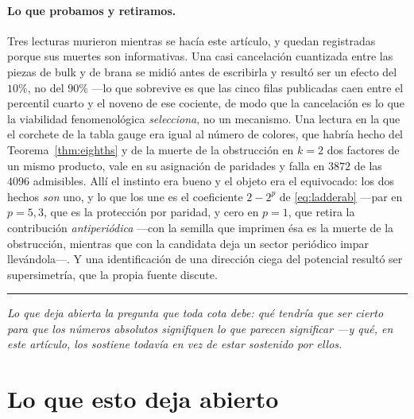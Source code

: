 \documentclass[11pt,a4paper]{article}
\newcommand{\bridge}[1]{\par\medskip\noindent
  \textcolor{hdrblue!45}{\rule{2.2cm}{0.6pt}}\;\;\parbox[t]{0.84\textwidth}{\small\itshape
  \textcolor{hdrblue!85}{#1}}\par\medskip}
\begin{document}
\paragraph{Lo que probamos y retiramos.} Tres lecturas murieron mientras se hacía este artículo, y
quedan registradas porque sus muertes son informativas. Una casi cancelación cuantizada entre las
piezas de bulk y de brana se midió antes de escribirla y resultó ser un efecto del $10\%$, no del
$90\%$ ---lo que sobrevive es que las cinco filas publicadas caen entre el percentil cuarto y el
noveno de ese cociente, de modo que la cancelación es lo que la viabilidad fenomenológica
\emph{selecciona}, no un mecanismo. Una lectura en la que el corchete de la tabla gauge era igual al
número de colores, que habría hecho del Teorema~\ref{thm:eighths} y de la muerte de la obstrucción en
$k=2$ dos factores de un mismo producto, vale en su asignación de paridades y falla en $3872$ de las
$4096$ admisibles. Allí el instinto era bueno y el objeto era el equivocado: los dos hechos \emph{son}
uno, y lo que los une es el coeficiente $2-2^{p}$ de \eqref{eq:ladderab} ---par en $p=5,3$, que es la
protección por paridad, y cero en $p=1$, que retira la contribución \emph{antiperiódica} ---con la
semilla que \cite{KM25} imprimen ésa es la muerte de la obstrucción, mientras que con la candidata
deja un sector periódico impar llevándola---. Y una identificación de una dirección
ciega del potencial resultó ser supersimetría, que la propia fuente discute.

\bridge{Lo que deja abierta la pregunta que toda cota debe: qué tendría que ser cierto para que los
números absolutos signifiquen lo que parecen significar ---y qué, en este artículo, los sostiene
todavía en vez de estar sostenido por ellos.}

\section{Lo que esto deja abierto}\label{sec:open}
\end{document}
